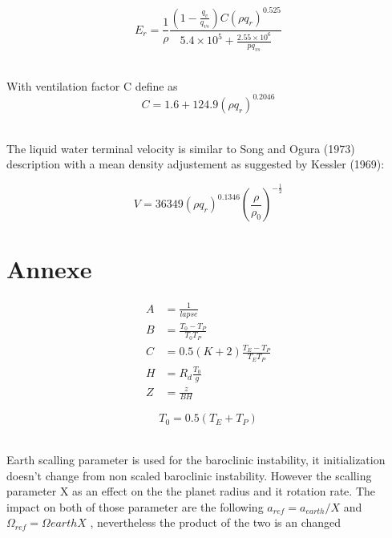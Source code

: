 \documentclass[times,doublespace]{fldauth}
\begin{document}
\begin{equation}
E_r=\frac{1}{\rho}\frac{\left(1-\frac{q_v}{q_{vs}}\right)C(\rho q_r)^{0.525}}{5.4\times10^5+\frac{2.55\times10^6}{pq_{vs}}}
\end{equation}



~\\ With ventilation factor C define as 
\begin{equation}
C=1.6+124.9(\rho q_r)^{0.2046}
\label{venti}
\end{equation}



~\\ The liquid water terminal velocity is similar to Song and Ogura (1973) description with a mean density adjustement as suggested by Kessler (1969):

\begin{equation}
V=36349(\rho q_r)^{0.1346}\left(\frac{\rho}{\rho_0}\right)^{-\frac{1}{2}}
\end{equation}



\clearpage 
\appendix
\section{Annexe}

\begin{align*}
A&= \frac{1}{lapse} \\
B&=\frac{T_0-T_P}{T_0T_P} \\
C&=0.5(K+2) \frac{T_E-T_P}{T_ET_P} \\
H&=R_d\frac{T_0} {g}\\
Z&=\frac{z}{B H}  
\end{align*}


\begin{equation*}
T_0=0.5(T_E +T_P)
\end{equation*}

~\\Earth scalling parameter is used for the baroclinic instability, it initialization doesn't change from non scaled baroclinic instability. However the scalling parameter X as an effect on the the planet radius and it rotation rate. The impact on both of those parameter are the following $a_{ref}=a_{earth}/X$ and $\Omega_{ref}=\Omega{earth}X$ , nevertheless the product of the two is an changed 
\end{document}

